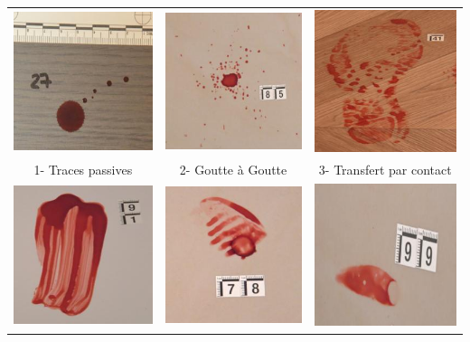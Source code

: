 \documentclass[a4paper]{article}
\begin{document}
\begin{table}[H]
    \centering
    \begin{tabular}{ccc}
        \includegraphics[width=0.25\linewidth]{../asset/data_labo/1_bois_350.jpg} & \includegraphics[width=0.25\linewidth]{../asset/data_labo/2_carrelage_523.jpg}& \includegraphics[width=0.25\linewidth]{../asset/data_labo/3_lino_888.jpg} \\
        1- Traces passives & 2- Goutte à Goutte & 3- Transfert par contact \\
        \includegraphics[width=0.25\linewidth]{../asset/data_labo/4_papier_1586.jpg} & \includegraphics[width=0.25\linewidth]{../asset/data_labo/5_carrelage_5605.jpg} & \includegraphics[width=0.25\linewidth]{../asset/data_labo/6_bois_604.jpg} \\

\end{tabular}
\end{table}
\end{document}
